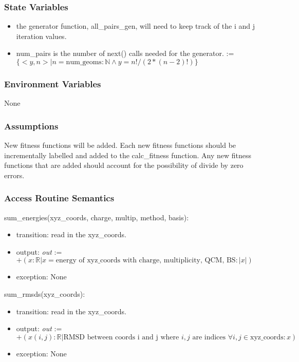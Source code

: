 \documentclass[12pt, titlepage]{article}
\begin{document}
\subsubsection{State Variables}

\begin{itemize}
	\item the generator function, all\_pairs\_gen, will need to keep track of 
	the i and j iteration values.
	\item num\_pairs is the number of next() calls needed for the generator. := 
	$\{<y,n> | n = \text{num\_geoms} : \mathbb{N} \land y = n!/(2*(n-2)!) \}$
\end{itemize}


\subsubsection{Environment Variables}

None

\subsubsection{Assumptions}

New fitness functions will be added. Each new fitness functions should be 
incrementally labelled and added to the calc\_fitness function. Any new 
fitness functions that are added should account for the possibility of divide 
by zero errors.

\subsubsection{Access Routine Semantics}

\noindent sum\_energies(xyz\_coords, charge, multip, method, basis):
\begin{itemize}
	\item transition: read in the xyz\_coords. 
	\item output: \textit{out} := $+(x: \mathbb{R}|x = \text{energy of 
		xyz\_coords with charge, multiplicity, QCM, BS}: |x|)$
	\item exception: None
\end{itemize}

\noindent sum\_rmsds(xyz\_coords):
\begin{itemize}
	\item transition: read in the xyz\_coords.
	\item output: \textit{out} := $+(x(i,j): \mathbb{R}| \text{RMSD between 
		coords i and j where } i,j \text{ are indices } \forall i,j \in 
	\text{xyz\_coords}: x)$
	\item exception: None
\end{itemize}
\end{document}
